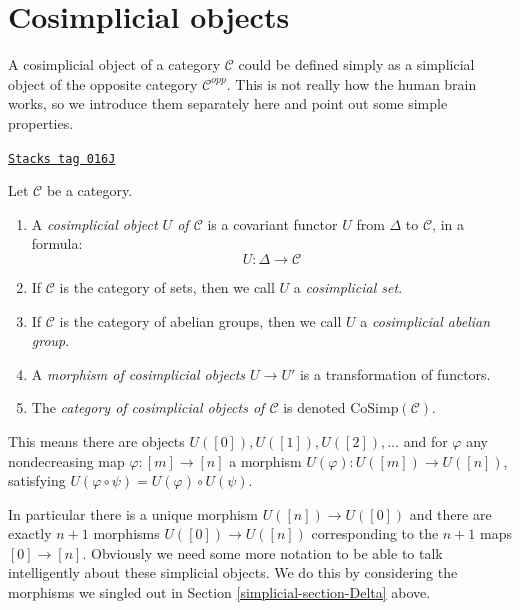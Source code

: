 \section{Cosimplicial objects}
\label{simplicial-section-cosimplicial-object}
A cosimplicial object of a category $\mathcal{C}$ could
be defined simply as a simplicial object of the
opposite category $\mathcal{C}^{opp}$. This is not
really how the human brain works, so we introduce
them separately here and point out some simple
properties.

\begin{definition}
\label{simplicial-definition-cosimplicial-object}
\href{https://stacks.math.columbia.edu/tag/016J}{\texttt{Stacks tag 016J}}

Let $\mathcal{C}$ be a category.
\begin{enumerate}
\item A {\it cosimplicial object $U$ of $\mathcal{C}$}
is a covariant functor $U$ from $\Delta$ to
$\mathcal{C}$, in a formula:
$$
U : \Delta \longrightarrow \mathcal{C}
$$
\item If $\mathcal{C}$ is the category of sets, then we call
$U$ a {\it cosimplicial set}.
\item If $\mathcal{C}$ is the category of abelian groups,
then we call $U$ a {\it cosimplicial abelian group}.
\item A {\it morphism of cosimplicial objects $U \to U'$}
is a transformation of functors.
\item The {\it category of cosimplicial objects of $\mathcal{C}$}
is denoted $\text{CoSimp}(\mathcal{C})$.
\end{enumerate}
\end{definition}

This means there are objects $U([0]), U([1]), U([2]), \ldots$
and for $\varphi$ any nondecreasing map $\varphi : [m] \to [n]$
a morphism $U(\varphi) : U([m]) \to U([n])$, satisfying
$U(\varphi \circ \psi) = U(\varphi) \circ U(\psi)$.

\medskip\noindent
In particular there is a unique morphism $U([n]) \to U([0])$ and there are
exactly $n + 1$ morphisms $U([0]) \to U([n])$ corresponding to
the $n + 1$ maps $[0] \to [n]$. Obviously we need some more notation
to be able to talk intelligently about these simplicial objects.
We do this by considering the morphisms we singled out in
Section \ref{simplicial-section-Delta} above.


